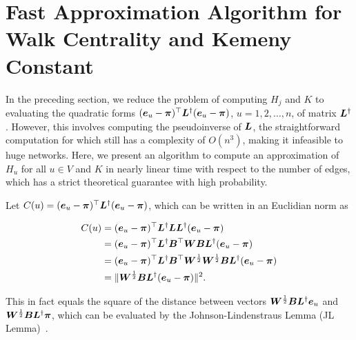 \documentclass[10pt,twocolumn,twoside]{IEEEtran}
\begin{document}


\section{Fast Approximation Algorithm for Walk Centrality and  Kemeny Constant}\label{sec:approx-algo1}

In the preceding section, we reduce the problem of computing  \(H_j\) and \(K\) to evaluating the quadratic forms \((\boldsymbol{e}_u - \boldsymbol{\pi})^{\top} \boldsymbol{L}^{\dagger} (\boldsymbol{e}_u- \boldsymbol{\pi})\), \(u=1,2,\ldots, n\), of matrix  \(\boldsymbol{L}^{\dagger}\).
However,  this involves computing the pseudoinverse of \(\boldsymbol{L}\), the straightforward computation for which still has a complexity of \(O(n^3)\), making it infeasible to huge networks. Here, we present an algorithm to compute an approximation of \(H_u\) for all  \(u \in V\) and \(K\)  in nearly linear time with respect to the number of edges,  which has a strict theoretical guarantee with  high probability.

Let \(C(u)=(\boldsymbol{e}_u - \boldsymbol{\pi})^{\top} \boldsymbol{L}^{\dagger} (\boldsymbol{e}_u- \boldsymbol{\pi})\), which can be written in an Euclidian norm as
\begin{small}
    \begin{equation}\label{EE12}
        \begin{split}
            C(u)&=(\boldsymbol{e}_u - \boldsymbol{\pi})^{\top} \boldsymbol{L}^{\dagger} \boldsymbol{L} \boldsymbol{L}^{\dagger} (\boldsymbol{e}_u - \boldsymbol{\pi}) \\
            &=(\boldsymbol{e}_u - \boldsymbol{\pi})^{\top} \boldsymbol{L}^{\dagger} \boldsymbol{B}^{\top} \boldsymbol{W} \boldsymbol{B} \boldsymbol{L}^{\dagger} (\boldsymbol{e}_u - \boldsymbol{\pi}) \\
            &=(\boldsymbol{e}_u - \boldsymbol{\pi})^{\top} \boldsymbol{L}^{\dagger} \boldsymbol{B}^{\top} \boldsymbol{W}^{\frac{1}{2}} \boldsymbol{W}^{\frac{1}{2}} \boldsymbol{B} \boldsymbol{L}^{\dagger} (\boldsymbol{e}_u - \boldsymbol{\pi}) \\
            &=\|\boldsymbol{W}^{\frac{1}{2}} \boldsymbol{B} \boldsymbol{L}^{\dagger} (\boldsymbol{e}_u - \boldsymbol{\pi})\|^2.
        \end{split}
    \end{equation}
\end{small}
This  in fact  equals the square of the distance between  vectors  \(\boldsymbol{W}^{\frac{1}{2}} \boldsymbol{B} \boldsymbol{L}^{\dagger} \boldsymbol{e}_u\) and \(\boldsymbol{W}^{\frac{1}{2}} \boldsymbol{B} \boldsymbol{L}^{\dagger} \boldsymbol{\pi}\), which can be evaluated by the Johnson-Lindenstraus
Lemma (JL Lemma)~\cite{Ac01}.
\end{document}

